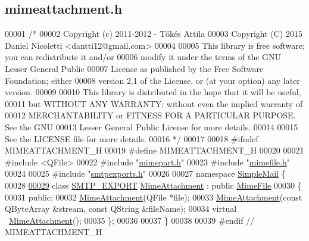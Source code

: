 \hypertarget{mimeattachment_8h_source}{}\subsection{mimeattachment.\+h}
\label{mimeattachment_8h_source}

\begin{DoxyCode}
00001 \textcolor{comment}{/*}
00002 \textcolor{comment}{  Copyright (c) 2011-2012 - Tőkés Attila}
00003 \textcolor{comment}{  Copyright (C) 2015 Daniel Nicoletti <dantti12@gmail.com>}
00004 \textcolor{comment}{}
00005 \textcolor{comment}{  This library is free software; you can redistribute it and/or}
00006 \textcolor{comment}{  modify it under the terms of the GNU Lesser General Public}
00007 \textcolor{comment}{  License as published by the Free Software Foundation; either}
00008 \textcolor{comment}{  version 2.1 of the License, or (at your option) any later version.}
00009 \textcolor{comment}{}
00010 \textcolor{comment}{  This library is distributed in the hope that it will be useful,}
00011 \textcolor{comment}{  but WITHOUT ANY WARRANTY; without even the implied warranty of}
00012 \textcolor{comment}{  MERCHANTABILITY or FITNESS FOR A PARTICULAR PURPOSE.  See the GNU}
00013 \textcolor{comment}{  Lesser General Public License for more details.}
00014 \textcolor{comment}{}
00015 \textcolor{comment}{  See the LICENSE file for more details.}
00016 \textcolor{comment}{*/}
00017 
00018 \textcolor{preprocessor}{#ifndef MIMEATTACHMENT\_H}
00019 \textcolor{preprocessor}{#define MIMEATTACHMENT\_H}
00020 
00021 \textcolor{preprocessor}{#include <QFile>}
00022 \textcolor{preprocessor}{#include "\hyperlink{mimepart_8h}{mimepart.h}"}
00023 \textcolor{preprocessor}{#include "\hyperlink{mimefile_8h}{mimefile.h}"}
00024 
00025 \textcolor{preprocessor}{#include "\hyperlink{smtpexports_8h}{smtpexports.h}"}
00026 
00027 \textcolor{keyword}{namespace }\hyperlink{namespace_simple_mail}{SimpleMail} \{
00028 
\hyperlink{class_simple_mail_1_1_mime_attachment}{00029} \textcolor{keyword}{class }\hyperlink{smtpexports_8h_ac580c9660cb24a34b13807f4eb0e1bd0}{SMTP\_EXPORT} \hyperlink{class_simple_mail_1_1_mime_attachment}{MimeAttachment} : \textcolor{keyword}{public} \hyperlink{class_simple_mail_1_1_mime_file}{MimeFile}
00030 \{
00031 \textcolor{keyword}{public}:
00032     \hyperlink{class_simple_mail_1_1_mime_attachment}{MimeAttachment}(QFile *file);
00033     \hyperlink{class_simple_mail_1_1_mime_attachment}{MimeAttachment}(\textcolor{keyword}{const} QByteArray &stream, \textcolor{keyword}{const} QString &fileName);
00034     \textcolor{keyword}{virtual} ~\hyperlink{class_simple_mail_1_1_mime_attachment}{MimeAttachment}();
00035 \};
00036 
00037 \}
00038 
00039 \textcolor{preprocessor}{#endif // MIMEATTACHMENT\_H}
\end{DoxyCode}
